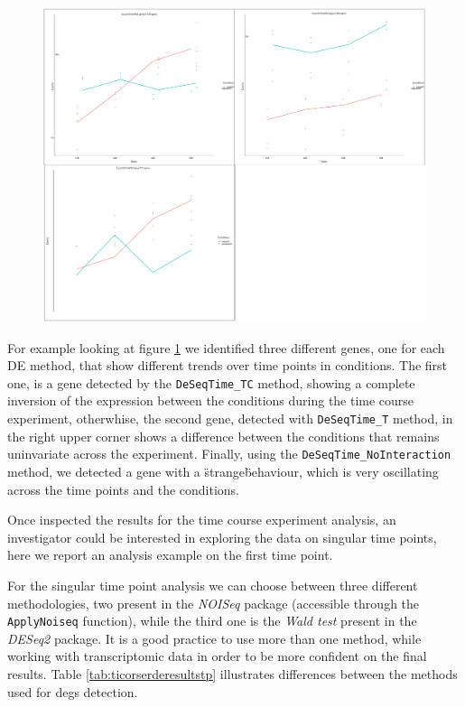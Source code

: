 \begin{figure}[H]
\includegraphics[width=\textwidth,keepaspectratio]{img/ticorser/de/trends/trends.pdf}
\caption[ticorser genes trends]{}
\label{fig:ticorsertrends}
\centering
\end{figure}

For example looking at figure \ref{fig:ticorsertrends} we identified three different genes, one for each DE method, that show different trends over time points in conditions.
The first one, is a gene detected by the \lstinline!DeSeqTime_TC! method, showing a complete inversion of the expression between the conditions during the time course experiment, otherwhise, the second gene, detected with \lstinline!DeSeqTime_T! method, in the right upper corner shows a difference between the conditions that remains uninvariate across the experiment.
Finally, using the \lstinline!DeSeqTime_NoInteraction! method, we detected a gene with a \"strange\" behaviour, which is very oscillating across the time points and the conditions. 

Once inspected the results for the time course experiment analysis, an investigator could be interested in exploring the data on singular time points, here we report an analysis example on the first time point.

For the singular time point analysis we can choose between three different methodologies, two present in the \textit{NOISeq} package (accessible through the \lstinline!ApplyNoiseq! function), while the third one is the \textit{Wald test} present in the \textit{DESeq2} package.
It is a good practice to use more than one method, while working with transcriptomic data in order to be more confident on the final results.
Table \ref{tab:ticorserderesultstp} illustrates differences between the methods used for \glspl{deg} detection.


